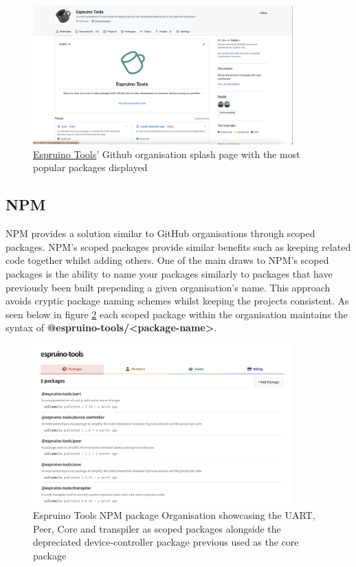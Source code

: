 \documentclass{l4proj}
\begin{document}
\begin{figure}[!ht]
    \centering
    \includegraphics[width=10cm]{dissertation/images/github-organisation.png}
    \caption{\href{https://github.com/espruino-tools}{Espruino Tools}' Github organisation splash page with the most popular packages displayed}
    \label{fig:ghorg}
\end{figure}

\subsection{NPM}

NPM provides a solution similar to GitHub organisations through scoped packages. NPM's scoped packages provide similar benefits such as keeping related code together whilst adding others. One of the main draws to NPM's scoped packages is the ability to name your packages similarly to packages that have previously been built prepending a given organisation's name. This approach avoids cryptic package naming schemes whilst keeping the projects consistent. As seen below in figure \ref{fig:npmorg} each scoped package within the organisation maintains the syntax of \textbf{@espruino-tools/<package-name>}.

\begin{figure}[!ht]
    \centering
    \includegraphics[width=10cm]{dissertation/images/npm-scoped-packages.png}
    \caption{Espruino Tools NPM package Organisation showcasing the UART, Peer, Core and transpiler as scoped packages alongside the depreciated device-controller package previous used as the core package}
    \label{fig:npmorg}
\end{figure}
\end{document}
